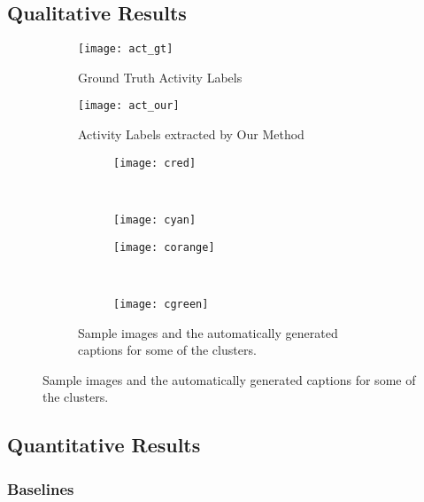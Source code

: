 \subsection{Qualitative Results}
\begin{figure}
  \begin{subfigure}[b]{0.5\textwidth}
  \texttt{[image: act\_gt]}
  \caption{Ground Truth Activity Labels}
  \end{subfigure}
  \begin{subfigure}[b]{0.5\textwidth}
  \texttt{[image: act\_our]}
  \caption{Activity Labels extracted by Our Method}
  \end{subfigure}

\begin{subfigure}[b]{0.5\textwidth}
\begin{subfigure}[b]{0.5\textwidth}
\texttt{[image: cred]}
\color[HTML]{FF3800}{Crack the eggs one at a time into a bowl.}
\end{subfigure}~
\begin{subfigure}[b]{0.5\textwidth}
\texttt{[image: cyan]}
\color[HTML]{00FFED}{Remove the omelette onto a plate.}
\end{subfigure}


\begin{subfigure}[b]{0.5\textwidth}
\texttt{[image: corange]}
\color[HTML]{FF9900}{You can either use a fork or wire whisk to beat the eggs into a bowl.}
\end{subfigure}~
\begin{subfigure}[b]{0.5\textwidth}
\texttt{[image: cgreen]}
\color[HTML]{9DFF00}{Eggs cook quickly, so make sure the pan gets very hot first; the butter melt completely.}
\end{subfigure}



\caption{Sample images and the automatically generated captions for some of the clusters.}
\end{subfigure}

\end{figure}

\subsection{Quantitative Results}
\subsubsection{Baselines}
